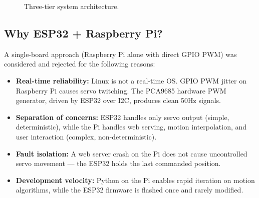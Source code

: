 \documentclass[12pt,a4paper]{article}
\begin{document}
\begin{figure}[H]
\centering
{}
\caption{Three-tier system architecture.}
\label{fig:arch}
\end{figure}

\subsection{Why ESP32 + Raspberry Pi?}

A single-board approach (Raspberry Pi alone with direct GPIO PWM) was considered and rejected for the following reasons:

\begin{itemize}[leftmargin=2cm]
    \item \textbf{Real-time reliability:} Linux is not a real-time OS. GPIO PWM jitter on Raspberry Pi causes servo twitching. The PCA9685 hardware PWM generator, driven by ESP32 over I2C, produces clean 50Hz signals.
    \item \textbf{Separation of concerns:} ESP32 handles only servo output (simple, deterministic), while the Pi handles web serving, motion interpolation, and user interaction (complex, non-deterministic).
    \item \textbf{Fault isolation:} A web server crash on the Pi does not cause uncontrolled servo movement --- the ESP32 holds the last commanded position.
    \item \textbf{Development velocity:} Python on the Pi enables rapid iteration on motion algorithms, while the ESP32 firmware is flashed once and rarely modified.
\end{itemize}
\end{document}
